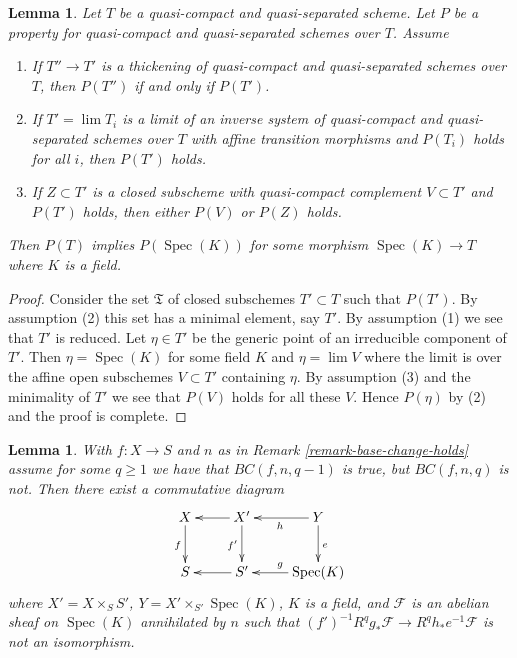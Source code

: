 \documentclass{amsart}
\theoremstyle{plain}
\newtheorem{lemma}[subsection]{Lemma}
\theoremstyle{definition}
\theoremstyle{remark}
\numberwithin{equation}{subsection}
\def\lim{\mathop{\mathrm{lim}}\nolimits}
\def\Spec{\mathop{\mathrm{Spec}}}
\begin{document}
\begin{lemma}
\label{lemma-formal-argument}
Let $T$ be a quasi-compact and quasi-separated scheme.
Let $P$ be a property for quasi-compact and quasi-separated
schemes over $T$. Assume
\begin{enumerate}
\item If $T'' \to T'$ is a thickening of quasi-compact and
quasi-separated schemes over $T$, then $P(T'')$ if and only if $P(T')$.
\item If $T' = \lim T_i$ is a limit of an inverse system of
quasi-compact and quasi-separated schemes over $T$ with affine
transition morphisms and $P(T_i)$ holds for all $i$, then
$P(T')$ holds.
\item If $Z \subset T'$ is a closed subscheme with
quasi-compact complement $V \subset T'$ and $P(T')$ holds,
then either $P(V)$ or $P(Z)$ holds.
\end{enumerate}
Then $P(T)$ implies $P(\Spec(K))$ for some morphism $\Spec(K) \to T$
where $K$ is a field.
\end{lemma}

\begin{proof}
Consider the set $\mathfrak T$ of closed subschemes $T' \subset T$
such that $P(T')$. By assumption (2) this set has a minimal element,
say $T'$. By assumption (1) we see that $T'$ is reduced.
Let $\eta \in T'$ be the generic point of an irreducible
component of $T'$. Then $\eta = \Spec(K)$ for some field
$K$ and $\eta = \lim V$ where the limit is over the affine
open subschemes $V \subset T'$ containing $\eta$.
By assumption (3) and the minimality of $T'$ we see
that $P(V)$ holds for all these $V$. Hence $P(\eta)$
by (2) and the proof is complete.
\end{proof}


\begin{lemma}
\label{lemma-base-change-does-not-hold-pre}
With $f : X \to S$ and $n$ as in Remark \ref{remark-base-change-holds}
assume for some $q \geq 1$ we have that $BC(f, n, q - 1)$ is true, but
$BC(f, n, q)$ is not. Then there exist a commutative diagram
$$
\xymatrix{
X \ar[d]_f & X' \ar[d]_{f'} \ar[l] & Y \ar[l]^h \ar[d]^e \\
S & S' \ar[l] & \Spec(K) \ar[l]_g
}
$$
where $X' = X \times_S S'$, $Y = X' \times_{S'} \Spec(K)$,
$K$ is a field, and $\mathcal{F}$ is an abelian sheaf
on $\Spec(K)$ annihilated by $n$ such that
$(f')^{-1}R^qg_*\mathcal{F} \to R^qh_*e^{-1}\mathcal{F}$
is not an isomorphism.
\end{lemma}
\end{document}
